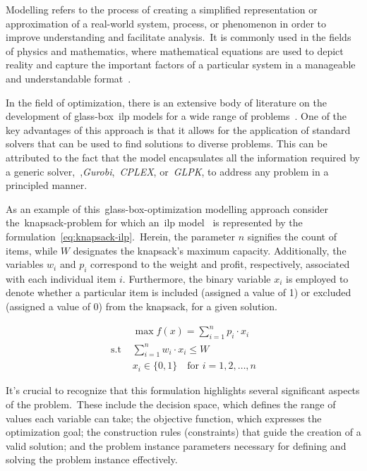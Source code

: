 Modelling refers to the process of creating a simplified representation or
approximation of a real-world system, process, or phenomenon in order to improve
understanding and facilitate analysis.~It is commonly used in the fields of
physics and mathematics, where mathematical equations are used to depict reality
and capture the important factors of a particular system in a manageable and
understandable format~\cite{witelski2015methods}.

In the field of optimization, there is an extensive body of literature on the
development of glass-box~\acrshort{ilp} models for a wide range of
problems~\cite{papadimitriou1998combinatorial,nocedal2006numerical,williamson2011design}.
One of the key advantages of this approach is that it allows for the application
of standard solvers that can be used to find solutions to diverse problems. This
can be attributed to the fact that the model encapsulates all the information
required by a generic solver,~\eg{},\textit{Gurobi},~\textit{CPLEX},
or~\textit{GLPK}, to address any problem in a principled manner.

As an example of this~\acrshort{glass-box-optimization} modelling approach
consider the~\acrshort{knapsack-problem} for which an~\acrshort{ilp}
model~\cite{yu2010combinatorial} is represented by the
formulation~\ref{eq:knapsack-ilp}.~Herein, the parameter $n$ signifies the count
of items, while $W$ designates the knapsack's maximum capacity.  Additionally,
the variables $w_{i}$ and $p_{i}$ correspond to the weight and profit,
respectively, associated with each individual item $i$. Furthermore, the binary
variable $x_{i}$ is employed to denote whether a particular item is included
(assigned a value of 1) or excluded (assigned a value of 0) from the knapsack,
for a given solution.

\begin{equation}
      \label{eq:knapsack-ilp}
      \begin{aligned}
                        & \max f(x) = \sum_{i=1}^{n} p_i \cdot x_i               \\
            \text{s.t } & \sum_{i=1}^{n} w_i \cdot x_i \leq W                    \\
                        & x_i \in \{0, 1\} \quad \text{for } i = 1, 2, \ldots, n
      \end{aligned}
\end{equation}

It's crucial to recognize that this formulation highlights several significant
aspects of the problem.~These include the decision space, which defines the
range of values each variable can take; the objective function, which expresses
the optimization goal; the construction rules (constraints) that guide the
creation of a valid solution; and the problem instance parameters necessary for
defining and solving the problem instance effectively.

